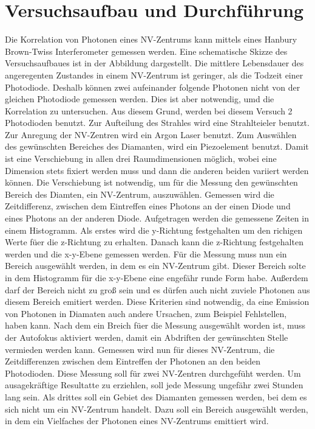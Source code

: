 \section{Versuchsaufbau und Durchf\"uhrung}


Die Korrelation von Photonen eines NV-Zentrums kann mittels eines  Hanbury Brown-Twiss Interferometer
gemessen werden. Eine schematische Skizze des Versuchsaufbaues ist in der Abbildung
dargestellt. Die mittlere Lebensdauer des angeregenten Zustandes in einem NV-Zentrum ist geringer, als die Todzeit einer Photodiode. Deshalb k\"onnen zwei aufeinander folgende Photonen nicht von der gleichen Photodiode gemessen werden. Dies ist aber notwendig, umd die Korrelation zu untersuchen. Aus diesem Grund, werden bei diesem Versuch 2 Photodioden benutzt. Zur Aufteilung des Strahles wird eine Strahlteieler benutzt. Zur Anregung der NV-Zentren wird ein Argon Laser benutzt. Zum Ausw\"ahlen des gew\"unschten Bereiches des Diamanten, wird ein Piezoelement benutzt. Damit ist eine Verschiebung in allen drei Raumdimensionen m\"oglich, wobei eine Dimension stets fixiert werden muss und dann die anderen beiden variiert werden k\"onnen. Die Verschiebung ist notwendig, um f\"ur die Messung den gew\"unschten Bereich des Diamten, ein NV-Zentrum, auszuw\"ahlen. Gemessen wird die Zeitdifferenz, zwischen dem Eintreffen eines Photons an der einen Diode und eines Photons an der anderen Diode. Aufgetragen werden die gemessene Zeiten in einem Histogramm.   Als erstes wird die y-Richtung festgehalten um den richigen Werte f\"uer die z-Richtung zu erhalten. Danach kann die z-Richtung festgehalten werden und die x-y-Ebene gemessen werden. F\"ur die Messung muss nun ein Bereich ausgew\"ahlt werden, in dem es  ein NV-Zentrum gibt.  Dieser Bereich solte in dem Histogramm f\"ur die x-y-Ebene eine engef\"ahr runde Form habe. Au{\ss}erdem darf der Bereich nicht zu gro{\ss} sein und es d\"urfen auch nicht zuviele Photonen aus diesem Bereich emitiert werden. Diese Kriterien sind notwendig, da eine Emission von Photonen in Diamaten auch andere Ursachen, zum Beispiel Fehlstellen, haben kann. Nach dem ein Breich f\"uer die Messung ausgew\"ahlt worden ist, muss der Autofokus aktiviert werden, damit ein Abdriften der gew\"unschten Stelle vermieden werden kann. Gemessen wird nun f\"ur dieses NV-Zentrum, die Zeitdifferenzen zwischen dem Eintreffen der Photonen an den beiden Photodioden. Diese Messung soll f\"ur zwei NV-Zentren durchgef\"uht werden. Um ausagekr\"aftige Resultatte zu erziehlen, soll jede Messung ungef\"ahr zwei Stunden lang sein. Als drittes soll ein Gebiet des Diamanten gemessen werden, bei dem es sich nicht um ein NV-Zentrum handelt. Dazu soll ein Bereich ausgew\"ahlt werden, in dem ein Vielfaches der Photonen eines NV-Zentrums emittiert wird. 


